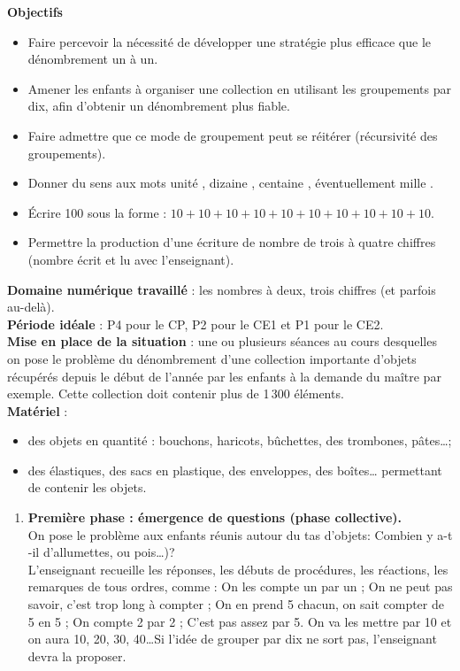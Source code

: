 \begin{exercice*}
{\bf Objectifs}
\begin{itemize}
   \item Faire percevoir la nécessité de développer une stratégie plus efficace que le dénombrement un à un.
   \item Amener les enfants à organiser une collection en utilisant les groupements par dix, afin d'obtenir un dénombrement plus fiable.
   \item Faire admettre que ce mode de groupement peut se réitérer (récursivité des groupements).
   \item Donner du sens aux mots \og unité \fg, \og dizaine \fg, \og centaine \fg, éventuellement \og mille \fg.
   \item Écrire 100 sous la forme : $10 + 10 + 10 + 10 + 10 + 10 + 10 + 10 + 10 + 10$.
   \item Permettre la production d'une écriture de nombre de trois à quatre chiffres (nombre écrit et lu avec l'enseignant).
\end{itemize}
{\bf Domaine numérique travaillé} : les nombres à deux, trois chiffres (et parfois au-delà). \\
{\bf Période idéale} : P4 pour le CP, P2 pour le CE1 et P1 pour le CE2. \\
{\bf Mise en place de la situation} : une ou plusieurs séances au cours desquelles on pose le problème du dénombrement d'une collection importante d'objets récupérés depuis le début de l'année par les enfants à la demande du maître par exemple. Cette collection doit contenir plus de 1\,300 éléments. \\
{\bf Matériel} :
\begin{itemize}
   \item des objets en quantité : bouchons, haricots, bûchettes, des trombones, pâtes\dots ;
   \item des élastiques, des sacs en plastique, des enveloppes, des boîtes\dots{} permettant de contenir les objets.
\end{itemize}

\begin{enumerate}
   \item {\bf Première phase : émergence de questions (phase collective).} \\
   On pose le problème aux enfants réunis autour du tas d'objets: \og Combien y a-t -il d'allumettes, ou pois\dots)? \fg \\
   L'enseignant recueille les réponses, les débuts de procédures, les réactions, les remarques de tous ordres, comme : \og On les compte un par un \fg ; \og On ne peut pas savoir, c'est trop long à compter \fg ; \og On en prend 5 chacun, on sait compter de 5 en 5 \fg ; \og On compte 2 par 2 \fg ; \og C'est pas assez par 5. On va les mettre par 10 et on aura 10, 20, 30, 40\dots \fg Si l'idée de grouper par dix ne sort pas, l'enseignant devra la proposer. \medskip


\end{enumerate}
\end{exercice*}
